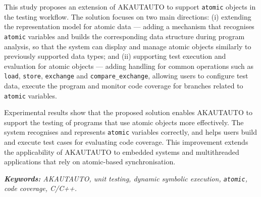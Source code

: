 This study proposes an extension of AKAUTAUTO to support \texttt{atomic} objects in the testing workflow. The solution
focuses on two main directions: (i) extending the representation model for atomic data --- adding a mechanism that
recognises \texttt{atomic} variables and builds the corresponding data structure during program analysis, so that the
system can display and manage atomic objects similarly to previously supported data types; and (ii) supporting test
execution and evaluation for atomic objects --- adding handling for common operations such as \texttt{load}, \texttt{store},
\texttt{exchange} and \texttt{compare\_exchange}, allowing users to configure test data, execute the program and monitor
code coverage for branches related to \texttt{atomic} variables.

Experimental results show that the proposed solution enables AKAUTAUTO to support the testing of programs that use atomic
objects more effectively. The system recognises and represents \texttt{atomic} variables correctly, and helps users build
and execute test cases for evaluating code coverage. This improvement extends the applicability of AKAUTAUTO to embedded
systems and multithreaded applications that rely on atomic-based synchronisation.

\vspace{-0.5cm}
\begin{flushleft}
  \textit{\textbf{Keywords: }AKAUTAUTO, unit testing, dynamic symbolic execution, \texttt{atomic}, code coverage, C/C++.}
\end{flushleft}
\changefontsizes[16pt]{13pt}
